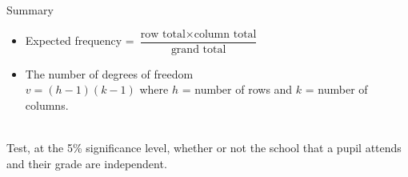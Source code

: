 \documentclass[fleqn]{article}
\begin{document}
\begin{mybox2}[colbacktitle=WildStrawberry]{Summary}
    \bfseries
    \begin{itemize}[leftmargin=5.5mm]
        \setlength\itemsep{1em}
        \item Expected frequency = $\dfrac{\text{row total}\times\text{column total}}{\text{grand total}}$
        \item The number of degrees of freedom\\
            $v=(h-1)(k-1)$ \mdseries\hspace{3cm}where $h$ = number of rows and $k$ = number of columns.
    \end{itemize}
\end{mybox2}
\begin{examplebox}{}{}
    \\
    Test, at the 5\% significance level, whether or not the school that a pupil attends and their grade are independent.    
\end{examplebox}
\newpage
\end{document}
